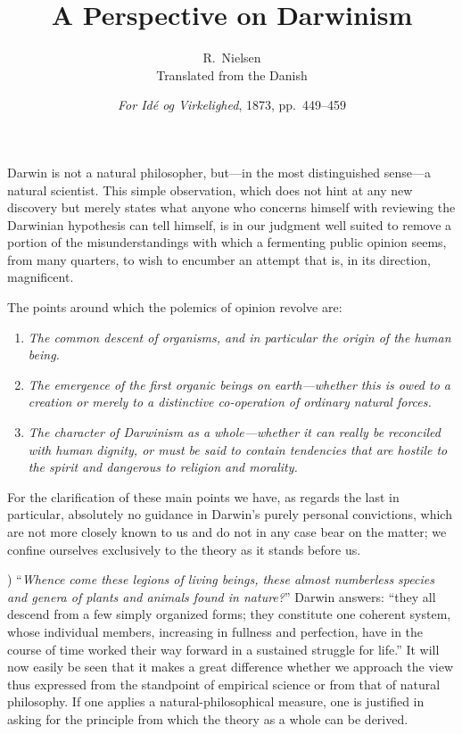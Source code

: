 \documentclass[12pt,a4paper]{article}
\title{\textbf{A Perspective on Darwinism}}
\author{R.\ Nielsen\\[4pt]
  \small Translated from the Danish}
\date{\emph{For Idé og Virkelighed}, 1873, pp.\ 449--459}
\begin{document}
\maketitle
\thispagestyle{fancy}

\bigskip

Darwin is not a natural philosopher, but---in the most distinguished
sense---a natural scientist. This simple observation, which does not
hint at any new discovery but merely states what anyone who concerns
himself with reviewing the Darwinian hypothesis can tell himself, is
in our judgment well suited to remove a portion of the
misunderstandings with which a fermenting public opinion seems, from
many quarters, to wish to encumber an attempt that is, in its
direction, magnificent.

The points around which the polemics of opinion revolve are:

\begin{enumerate}
  \item \emph{The common descent of organisms, and in particular the origin
        of the human being.}
  \item \emph{The emergence of the first organic beings on earth---whether
        this is owed to a creation or merely to a distinctive
        co-operation of ordinary natural forces.}
  \item \emph{The character of Darwinism as a whole---whether it can really
        be reconciled with human dignity, or must be said to contain
        tendencies that are hostile to the spirit and dangerous to
        religion and morality.}
\end{enumerate}

For the clarification of these main points we have, as regards the
last in particular, absolutely no guidance in Darwin's purely personal
convictions, which are not more closely known to us and do not in any
case bear on the matter; we confine ourselves exclusively to the
theory as it stands before us.

\medskip

) ``\emph{Whence come these legions of living beings, these almost
numberless species and genera of plants and animals found in nature?}''
Darwin answers: ``they all descend from a few simply organized forms;
they constitute one coherent system, whose individual members,
increasing in fullness and perfection, have in the course of time
worked their way forward in a sustained struggle for life.'' It will now easily be seen that it makes a great difference whether
we approach the view thus expressed from the standpoint of empirical
science or from that of natural philosophy. If one applies a
natural-philosophical measure, one is justified in asking for the
principle from which the theory as a whole can be derived.
\end{document}
